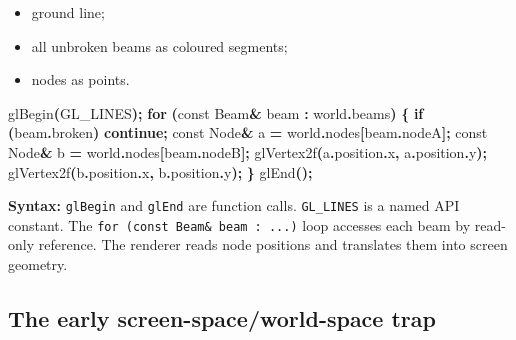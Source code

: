 \documentclass[
  10pt,
  a4paper,
]{article}
\newenvironment{Shaded}{\begin{snugshade}}{\end{snugshade}}
\newcommand{\AttributeTok}[1]{\textcolor[rgb]{0.13,0.29,0.53}{#1}}
\newcommand{\ControlFlowTok}[1]{\textcolor[rgb]{0.13,0.29,0.53}{\textbf{#1}}}
\newcommand{\NormalTok}[1]{#1}
\newcommand{\OperatorTok}[1]{\textcolor[rgb]{0.81,0.36,0.00}{\textbf{#1}}}
\providecommand{\tightlist}{%
  \setlength{\itemsep}{0pt}\setlength{\parskip}{0pt}}
\begin{document}
\begin{itemize}
\tightlist
\item
  ground line;
\item
  all unbroken beams as coloured segments;
\item
  nodes as points.
\end{itemize}

\begin{Shaded}
\begin{Highlighting}[]
\NormalTok{glBegin}\OperatorTok{(}\NormalTok{GL\_LINES}\OperatorTok{);}
\ControlFlowTok{for} \OperatorTok{(}\AttributeTok{const}\NormalTok{ Beam}\OperatorTok{\&}\NormalTok{ beam }\OperatorTok{:}\NormalTok{ world}\OperatorTok{.}\NormalTok{beams}\OperatorTok{)} \OperatorTok{\{}
    \ControlFlowTok{if} \OperatorTok{(}\NormalTok{beam}\OperatorTok{.}\NormalTok{broken}\OperatorTok{)} \ControlFlowTok{continue}\OperatorTok{;}
    \AttributeTok{const}\NormalTok{ Node}\OperatorTok{\&}\NormalTok{ a }\OperatorTok{=}\NormalTok{ world}\OperatorTok{.}\NormalTok{nodes}\OperatorTok{[}\NormalTok{beam}\OperatorTok{.}\NormalTok{nodeA}\OperatorTok{];}
    \AttributeTok{const}\NormalTok{ Node}\OperatorTok{\&}\NormalTok{ b }\OperatorTok{=}\NormalTok{ world}\OperatorTok{.}\NormalTok{nodes}\OperatorTok{[}\NormalTok{beam}\OperatorTok{.}\NormalTok{nodeB}\OperatorTok{];}
\NormalTok{    glVertex2f}\OperatorTok{(}\NormalTok{a}\OperatorTok{.}\NormalTok{position}\OperatorTok{.}\NormalTok{x}\OperatorTok{,}\NormalTok{ a}\OperatorTok{.}\NormalTok{position}\OperatorTok{.}\NormalTok{y}\OperatorTok{);}
\NormalTok{    glVertex2f}\OperatorTok{(}\NormalTok{b}\OperatorTok{.}\NormalTok{position}\OperatorTok{.}\NormalTok{x}\OperatorTok{,}\NormalTok{ b}\OperatorTok{.}\NormalTok{position}\OperatorTok{.}\NormalTok{y}\OperatorTok{);}
\OperatorTok{\}}
\NormalTok{glEnd}\OperatorTok{();}
\end{Highlighting}
\end{Shaded}

\textbf{Syntax:} \texttt{glBegin} and \texttt{glEnd} are function calls.
\texttt{GL\_LINES} is a named API constant. The
\texttt{for\ (const\ Beam\&\ beam\ :\ ...)} loop accesses each beam by
read-only reference. The renderer reads node positions and translates
them into screen geometry.

\subsection{The early screen-space/world-space
trap}\label{the-early-screen-spaceworld-space-trap}
\end{document}
